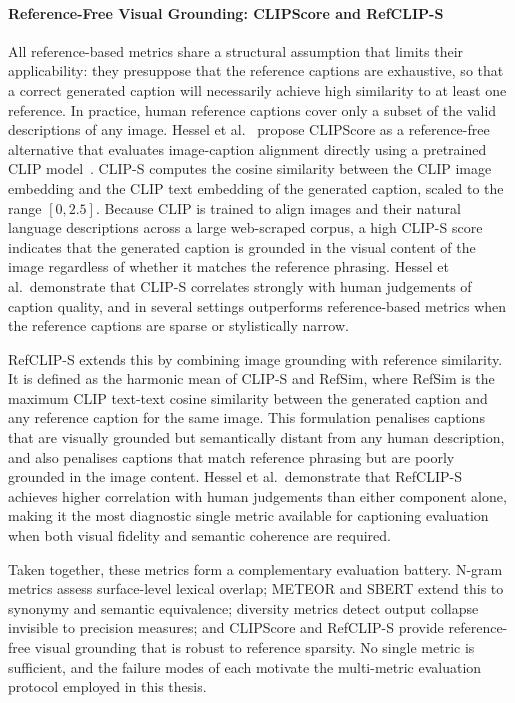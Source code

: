 \paragraph{Reference-Free Visual Grounding: CLIPScore and RefCLIP-S}
All reference-based metrics share a structural assumption that 
limits their applicability: they presuppose that the reference 
captions are exhaustive, so that a correct generated caption will 
necessarily achieve high similarity to at least one reference. In 
practice, human reference captions cover only a subset of the 
valid descriptions of any image. Hessel et 
al.~\cite{Hessel_2021_CLIPScore} propose CLIPScore as a 
reference-free alternative that evaluates image-caption alignment 
directly using a pretrained CLIP 
model~\cite{Radford_2021_CLIP}. 
CLIP-S computes the cosine similarity between the CLIP image 
embedding and the CLIP text embedding of the generated caption, 
scaled to the range $[0, 2.5]$. Because CLIP is trained to align 
images and their natural language descriptions across a large 
web-scraped corpus, a high CLIP-S score indicates that the 
generated caption is grounded in the visual content of the image 
regardless of whether it matches the reference phrasing. Hessel 
et al.\ demonstrate that CLIP-S correlates strongly with human 
judgements of caption quality, and in several settings 
outperforms reference-based metrics when the reference captions 
are sparse or stylistically narrow.

RefCLIP-S extends this by combining image grounding with reference 
similarity. It is defined as the harmonic mean of CLIP-S and 
RefSim, where RefSim is the maximum CLIP text-text cosine 
similarity between the generated caption and any reference caption 
for the same image. This formulation penalises captions that are 
visually grounded but semantically distant from any human 
description, and also penalises captions that match reference 
phrasing but are poorly grounded in the image content. Hessel et 
al.\ demonstrate that RefCLIP-S achieves higher correlation with 
human judgements than either component alone, making it the most 
diagnostic single metric available for captioning evaluation when 
both visual fidelity and semantic coherence are required.

Taken together, these metrics form a complementary evaluation 
battery. N-gram metrics assess surface-level lexical overlap; 
METEOR and SBERT extend this to synonymy and semantic equivalence; 
diversity metrics detect output collapse invisible to precision 
measures; and CLIPScore and RefCLIP-S provide reference-free 
visual grounding that is robust to reference sparsity. No single 
metric is sufficient, and the failure modes of each motivate the 
multi-metric evaluation protocol employed in this thesis.

